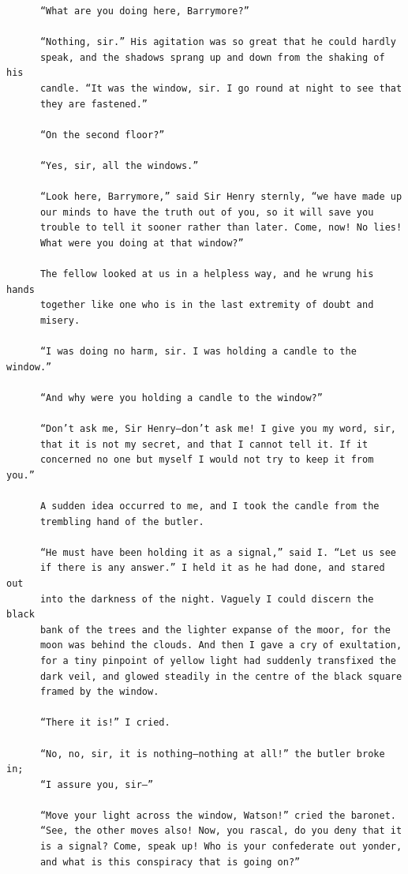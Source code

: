 \documentclass{article}
\begin{document}
\begin{verbatim}
      “What are you doing here, Barrymore?”

      “Nothing, sir.” His agitation was so great that he could hardly
      speak, and the shadows sprang up and down from the shaking of his
      candle. “It was the window, sir. I go round at night to see that
      they are fastened.”

      “On the second floor?”

      “Yes, sir, all the windows.”

      “Look here, Barrymore,” said Sir Henry sternly, “we have made up
      our minds to have the truth out of you, so it will save you
      trouble to tell it sooner rather than later. Come, now! No lies!
      What were you doing at that window?”

      The fellow looked at us in a helpless way, and he wrung his hands
      together like one who is in the last extremity of doubt and
      misery.

      “I was doing no harm, sir. I was holding a candle to the window.”

      “And why were you holding a candle to the window?”

      “Don’t ask me, Sir Henry—don’t ask me! I give you my word, sir,
      that it is not my secret, and that I cannot tell it. If it
      concerned no one but myself I would not try to keep it from you.”

      A sudden idea occurred to me, and I took the candle from the
      trembling hand of the butler.

      “He must have been holding it as a signal,” said I. “Let us see
      if there is any answer.” I held it as he had done, and stared out
      into the darkness of the night. Vaguely I could discern the black
      bank of the trees and the lighter expanse of the moor, for the
      moon was behind the clouds. And then I gave a cry of exultation,
      for a tiny pinpoint of yellow light had suddenly transfixed the
      dark veil, and glowed steadily in the centre of the black square
      framed by the window.

      “There it is!” I cried.

      “No, no, sir, it is nothing—nothing at all!” the butler broke in;
      “I assure you, sir—”

      “Move your light across the window, Watson!” cried the baronet.
      “See, the other moves also! Now, you rascal, do you deny that it
      is a signal? Come, speak up! Who is your confederate out yonder,
      and what is this conspiracy that is going on?”


\end{verbatim}
\end{document}
